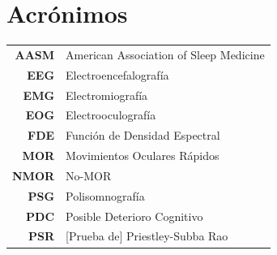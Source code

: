 \documentclass[12pt,letterpaper,draft]{book}
\begin{document}
\chapter*{Acrónimos}

\begin{tabular}{rl}
\textbf{AASM} & American Association of Sleep Medicine
\\
\textbf{EEG} & Electroencefalografía
\\
\textbf{EMG} & Electromiografía
\\
\textbf{EOG} & Electrooculografía
\\
\textbf{FDE} & Función de Densidad Espectral
\\
\textbf{MOR} & Movimientos Oculares Rápidos
\\
\textbf{NMOR}& No-MOR
\\
\textbf{PSG} & Polisomnografía
\\
\textbf{PDC} & Posible Deterioro Cognitivo
\\
\textbf{PSR} & [Prueba de] Priestley-Subba Rao
\\
\end{tabular}

\newpage


\thispagestyle{empty}

\tableofcontents
\newpage


\setcounter{page}{1}

\end{document}
